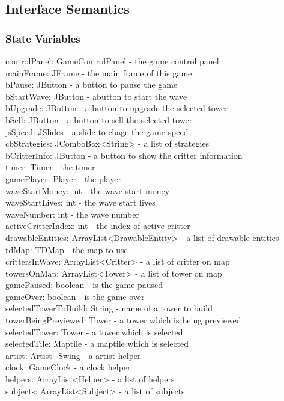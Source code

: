 \documentclass[12,english]{article}
\begin{document}
		\subsection{Interface Semantics}
		\subsubsection{State Variables}
		controlPanel: GameControlPanel - the game control panel\\
	    mainFrame: JFrame - the main frame of this game\\
	    bPause: JButton - a button to pause the game\\
	    bStartWave: JButton - abutton to start the wave\\
    	bUpgrade: JButton - a button to upgrade the selected tower\\
        bSell: JButton - a button to sell the selected tower\\
        jsSpeed: JSlides - a slide to chage the game speed\\
        cbStrategies: JComboBox<String> - a list of strategies\\
        bCritterInfo: JButton - a button to show the critter information\\
        timer: Timer - the timer\\
        gamePlayer: Player - the player\\
        waveStartMoney: int - the wave start money\\ 
	    waveStartLives: int - the wave start lives\\
        waveNumber: int - the wave number\\
        activeCritterIndex: int - the index of active critter\\
	    drawableEntities: ArrayList<DrawableEntity> - a list of drawable entities\\
        tdMap: TDMap - the map to use\\
	    crittersInWave: ArrayList<Critter> - a list of critter on map\\
	    towersOnMap: ArrayList<Tower> - a list of tower on map\\
        gamePaused: boolean - is the game paused\\
        gameOver: boolean - is the game over\\
        selectedTowerToBuild: String - name of a tower to build\\
        towerBeingPreviewed: Tower - a tower which is being previewed\\
        selectedTower: Tower - a tower which is selected\\
        selectedTile: Maptile - a maptile which is selected\\
	    artist: Artist\_Swing - a artist helper\\
        clock: GameClock - a clock helper\\
	    helpers: ArrayList<Helper> - a list of helpers\\
        subjects: ArrayList<Subject> - a list of subjects\\
		
\end{document}
